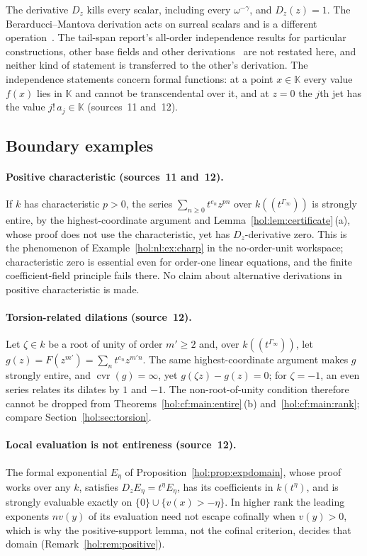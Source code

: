 \documentclass[11pt]{article}
\numberwithin{equation}{section}
\theoremstyle{definition}
\theoremstyle{remark}
\newcommand{\KK}{\mathbb K}
\newcommand{\cvr}{\operatorname{cvr}}
\begin{document}
The derivative $D_z$ kills every scalar, including every $\omega^{-\gamma}$,
and $D_z(z)=1$. The Berarducci--Mantova derivation acts on surreal scalars and
is a different operation~\cite{bm}. The tail-span report's all-order
independence results for particular constructions, other base fields and
other derivations~\cite{repotail} are not restated here, and neither kind of
statement is transferred to the other's derivation. The independence
statements concern formal functions: at a point $x\in\KK$ every value $f(x)$
lies in $\KK$ and cannot be transcendental over it, and at $z=0$ the $j$th jet
has the value $j!\,a_j\in\KK$ (sources~11 and~12).

\subsection{Boundary examples}\label{hol:cf:sub:boundaries}

\paragraph{Positive characteristic (sources~11 and~12).}
If $k$ has characteristic $p>0$, the series $\sum_{n\ge0}t^{e_n}z^{pn}$ over
$k((t^{\Gamma_\infty}))$ is strongly entire, by the highest-coordinate
argument and Lemma~\ref{hol:lem:certificate}\,(a), whose proof does not use the
characteristic, yet has $D_z$-derivative zero. This is the phenomenon of
Example~\ref{hol:nl:ex:charp} in the no-order-unit workspace; characteristic
zero is essential even for order-one linear equations, and the finite
coefficient-field principle fails there. No claim about alternative
derivations in positive characteristic is made.

\paragraph{Torsion-related dilations (source~12).}
Let $\zeta\in k$ be a root of unity of order $m'\ge2$ and, over
$k((t^{\Gamma_\infty}))$, let $g(z)=F(z^{m'})=\sum_nt^{e_n}z^{m'n}$. The same highest-coordinate argument
makes $g$ strongly entire, and $\cvr(g)=\infty$, yet $g(\zeta z)-g(z)=0$; for
$\zeta=-1$, an even series relates its dilates by $1$ and $-1$. The
non-root-of-unity condition therefore cannot be dropped from
Theorems~\ref{hol:cf:main:entire}\,(b) and~\ref{hol:cf:main:rank}; compare
Section~\ref{hol:sec:torsion}.

\paragraph{Local evaluation is not entireness (source~12).}
The formal exponential $E_\eta$ of Proposition~\ref{hol:prop:expdomain}, whose
proof works over any $k$, satisfies $D_zE_\eta=t^\eta E_\eta$, has its
coefficients in $k(t^\eta)$, and is strongly evaluable exactly on
$\{0\}\cup\{v(x)>-\eta\}$. In higher rank the leading exponents $nv(y)$ of its
evaluation need not escape cofinally when $v(y)>0$, which is why the
positive-support lemma, not the cofinal criterion, decides that domain
(Remark~\ref{hol:rem:positive}).
\end{document}
